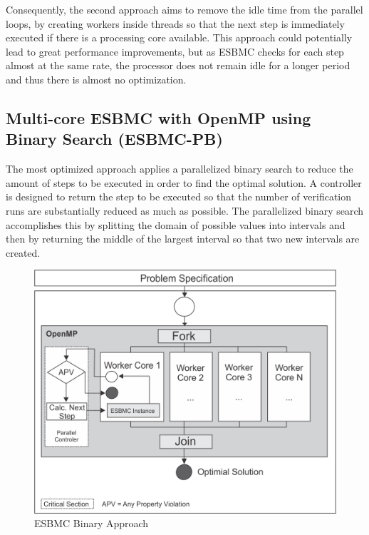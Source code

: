 Consequently, the second approach aims to remove the idle time from the parallel loops, by creating workers inside threads so that the next step is immediately executed if there is a processing core available. This approach could potentially lead to great performance improvements, but as ESBMC checks for each step almost at the same rate, the processor does not remain idle for a longer period and thus there is almost no optimization.

\subsection{Multi-core ESBMC with OpenMP using Binary Search (ESBMC-PB)}
\label{Multi-core-ESBMC-with-OpenMP-using-Binary-Search}

The most optimized approach applies a parallelized binary search to reduce the amount of steps to be executed in order to find the optimal solution. A controller is designed to return the step to be executed so that the number of verification runs are substantially reduced as much as possible. The parallelized binary search accomplishes this by splitting the domain of possible values into intervals and then by returning the middle of the largest interval so that two new intervals are created.
%
\begin{figure}[ht]
	\centering
  \includegraphics[scale=0.75]{Image/esbmc-parallel-Controler.png} 
	\caption{ESBMC Binary Approach}
	\label{ESBMC-Binary-Approach}
\end{figure}

